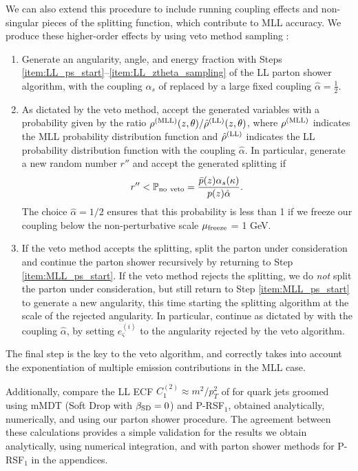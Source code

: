 \documentclass[letterpaper,11pt]{article}
\begin{document}
We can also extend this procedure to include running coupling effects and non-singular pieces of the splitting function, which contribute to MLL accuracy.
%
We produce these higher-order effects by using veto method sampling \cite{Sjostrand:2007gs,Larkoski:2013paa,Sjostrand:2014zea}:
%
\begin{enumerate}
	\item
	\label{item:MLL_ps_start}
	Generate an angularity, angle, and energy fraction with Steps \ref{item:LL_ps_start}--\ref{item:LL_ztheta_sampling} of the LL parton shower algorithm, with the coupling \(\alpha_s\) of  replaced by a large fixed coupling \(\hat\alpha = \frac{1}{2}\).

	\item
	As dictated by the veto method, accept the generated variables with a probability given by the ratio \(\rho^{\rm(MLL)}(z,\theta)/\hat\rho^{\rm(LL)}(z,\theta)\), where \(\rho^{\rm(MLL)}\) indicates the MLL probability distribution function and \(\hat\rho^{\rm(LL)}\) indicates the LL probability distribution function with the coupling \(\hat\alpha\).
	In particular, generate a new random number \(r''\) and accept the generated splitting if
	\begin{align}
	    r'' < \mathbb{P}_{\rm no~veto} = \frac{\bar{p}(z)\alpha_s(\kappa)}{p(z)\hat\alpha}
	    .
	\end{align}
    The choice \(\hat \alpha = 1/2\) ensures that this probability is less than 1 if we freeze our coupling below the non-perturbative scale \(\mu_{\rm freeze}\) = 1 GeV.

	\item
	If the veto method accepts the splitting, split the parton under consideration and continue the parton shower recursively by returning to Step \ref{item:MLL_ps_start}.
	If the veto method rejects the splitting, we do \textit{not} split the parton under consideration, but still return to Step \ref{item:MLL_ps_start} to generate a new angularity, this time starting the splitting algorithm at the scale of the rejected angularity.
	In particular, continue as dictated by  with the coupling \(\hat\alpha\), by setting \(e_\varsigma^{(i)}\) to the angularity rejected by the veto algorithm.
\end{enumerate}
%
The final step is the key to the veto algorithm, and correctly takes into account the exponentiation of multiple emission contributions in the MLL case.

Additionally,  compare the LL ECF \(C_1^{(2)} \approx m^2 / p_T^2\) of  for quark jets groomed using mMDT (Soft Drop with \(\beta_{\rm SD} = 0\)) and P-RSF\(_1\), obtained analytically, numerically, and using our parton shower procedure.
%
The agreement between these calculations provides a simple validation for the results we obtain analytically, using numerical integration, and with parton shower methods for P-RSF\(_1\) in the appendices.



\end{document}
